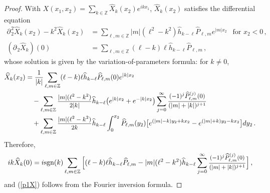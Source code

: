 \documentclass[11pt]{article}
\theoremstyle{plain}
\theoremstyle{definition}
\theoremstyle{definition}
\def\bbZ{{\mathbb Z}}
\def\p{\text{\bf\emph{p}}}
\def\ft #1{{\widehat{#1}}}
\def\p{{\partial\hspace{1pt}}}
\def\smallexp#1{{\text{\small #1}}}
\def\footnoteexp#1{{\text{\footnotesize #1}}}
\def\dfrac#1#2{\smallexp{$\displaystyle{}\frac{#1}{#2}$}}
\def\ddfrac#1#2{\footnoteexp{$\displaystyle{}\frac{#1}{#2}$}}
\begin{document}
\begin{proof}
With $X(x_1,x_2) = \sum\limits_{k\in\bbZ} \ft{X}_k(x_2) e^{ikx_1}$,
 $\ft{X}_k(x_2)$ satisfies the differential equation
\begin{align*}
\p_{\!2}^2 \ft{X}_k(x_2) - k^2 \ft{X}_k(x_2) &=
\sum_{\ell,m\in \bbZ} |m| (\ell^2 - k^2) \ft{h}_{k-\ell} \ft{P}_{\ell,m} e^{|m|x_2} \ \   \text{ for } x_2 < 0\,,\\
(\p_{\!2} \ft{X}_k)(0) &= %
\sum_{\ell,m\in\bbZ} (\ell-k)\ell \ft{h}_{k-\ell} \ft{P}_{\ell,m} \,,
\end{align*}
whose solution is given by the variation-of-parameters formula: for $k\ne 0$,
\begin{align*}
\ft{X}_k(x_2) &= \frac{1}{|k|} \sum_{\ell,m\in\bbZ} (\ell-k)\ell \ft{h}_{k-\ell} \ft{P}_{\ell,m}(0) e^{|k|x_2} \\
&\quad - \sum_{\ell,m\in \bbZ} \dfrac{|m| (\ell^2 - k^2)}{2|k|} \ft{h}_{k-\ell} \big(e^{|k| x_2} + e^{-|k| x_2}\big) \sum_{j=0}^\infty \dfrac{(-1)^j \ft{P}^{(j)}_{\ell,m}(0)}{(|m|+|k|)^{j+1}} \nonumber\\
&\quad + \sum_{\ell,m\in \bbZ} \dfrac{|m| (\ell^2 - k^2)}{2k} \ft{h}_{k-\ell} \int_0^{x_2} \ft{P}_{\ell,m}(y_2) \big[e^{(|m|-k)y_2 + kx_2} - e^{(|m|+k)y_2-kx_2}\big]dy_2 %
\,.
\end{align*}
Therefore,
\begin{equation}\label{ikX}
i k \ft{X}_k(0) = i \text{\rm sgn}(k) \sum_{\ell,m\in\bbZ} \Big[(\ell-k)\ell \ft{h}_{k-\ell} \ft{P}_{\ell,m} - |m| (\ell^2 - k^2) \ft{h}_{k-\ell} \sum_{j=0}^\infty \ddfrac{(-1)^j \ft{P}^{(j)}_{\ell,m}(0)}{(|m|+|k|)^{j+1}}\Big] \,,
\end{equation}
and (\ref{p1X}) follows from the Fourier inversion formula.


\end{proof}
\end{document}
